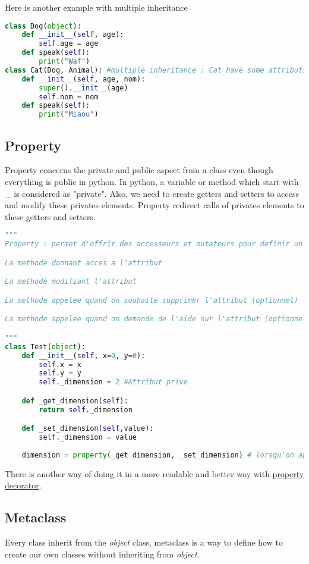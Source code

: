 \documentclass[a4paper, 12pt, titlepage]{scrartcl} %
\begin{document}
Here is another example with multiple inheritance
\begin{lstlisting}[language=Python]
class Dog(object):
	def __init__(self, age):
		self.age = age
	def speak(self):
		print("Waf")
class Cat(Dog, Animal): #multiple inheritance : Cat have some attributs from Dog but is also an Animal
	def __init__(self, age, nom):
		super().__init__(age)
		self.nom = nom
	def speak(self):
		print("Miaou")
\end{lstlisting} \vspace{5mm}

\subsection{Property}
Property concerns the private and public aspect from a class even though everything is public in python. In python, a variable or method which start with \_ is considered as "private". Also, we need to create getters and setters to access and modify these privates elements. Property redirect calls of privates elements to these getters and setters.
\begin{lstlisting}[language=Python]
"""
Property : permet d'offrir des accesseurs et mutateurs pour definir un attribut prive

La methode donnant acces a l'attribut

La methode modifiant l'attribut

La methode appelee quand on souhaite supprimer l'attribut (optionnel)

La methode appelee quand on demande de l'aide sur l'attribut (optionnel)

"""
class Test(object):
	def __init__(self, x=0, y=0):
		self.x = x
		self.y = y
		self._dimension = 2 #Attribut prive

	def _get_dimension(self):
		return self._dimension

	def _set_dimension(self,value):
		self._dimension = value
		
	dimension = property(_get_dimension, _set_dimension) # lorsqu'on appelera objet.dimension, property redirigera vers les accesseurs/mutateurs prives
\end{lstlisting} \vspace{5mm}

There is another way of doing it in a more readable and better way with \hyperref[subsec:Property]{property decorator}.

\subsection{Metaclass}
Every class inherit from the \textit{object} class, metaclass is a way to define how to create our own classes without inheriting from \textit{object}.
\end{document}
